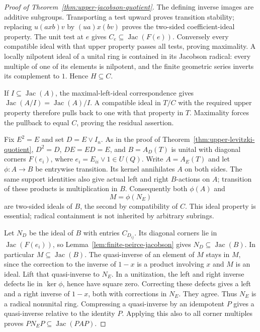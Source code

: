 \begin{proof}[Proof of Theorem~\ref{thm:upper-jacobson-quotient}]
The defining inverse images are additive subgroups. Transporting a
test upward proves transition stability; replacing $u(axb)v$ by
$(ua)x(bv)$ proves the two-sided coefficient-ideal property.
The unit test at $e$ gives $C_e\subseteq\operatorname{Jac}(F(e))$.
Conversely every compatible ideal with that upper property passes
all tests, proving maximality. A locally nilpotent ideal of a
unital ring is contained in its Jacobson radical: every multiple
of one of its elements is nilpotent, and the finite geometric
series inverts its complement to $1$. Hence $H\subseteq C$.

If $I\subseteq\operatorname{Jac}(A)$, the maximal-left-ideal
correspondence gives
$\operatorname{Jac}(A/I)=\operatorname{Jac}(A)/I$.
A compatible ideal in $T/C$ with the required upper property
therefore pulls back to one with that property in $T$.
Maximality forces the pullback to equal $C$, proving the residual
assertion.

Fix $E^2=E$ and set $D=E\vee I_n$. As in the proof of
Theorem~\ref{thm:upper-levitzki-quotient}, $D^2=D$, $DE=ED=E$,
and $B=A_D(T)$ is unital with diagonal corners
$F(e_i)$, where $e_i=E_{ii}\vee1\in U(Q)$. Write
$A=A_E(T)$ and let $\phi:A\to B$ be entrywise transition.
Its kernel annihilates $A$ on both sides. The same support
identities also give actual left and right $B$-actions on $A$;
transition of these products is multiplication in $B$.
Consequently both $\phi(A)$ and
\[
 M=\phi(N_E)
\]
are two-sided ideals of $B$, the second by compatibility of $C$.
This ideal property is essential; radical containment is not
inherited by arbitrary subrings.

Let $N_D$ be the ideal of $B$ with entries $C_{D_{ij}}$.
Its diagonal corners lie in $\operatorname{Jac}(F(e_i))$, so
Lemma~\ref{lem:finite-peirce-jacobson} gives
$N_D\subseteq\operatorname{Jac}(B)$. In particular
$M\subseteq\operatorname{Jac}(B)$. The quasi-inverse of an
element of $M$ stays in $M$, since the correction to the inverse
of $1-x$ is a product involving $x$ and $M$ is an ideal.
Lift that quasi-inverse to $N_E$. In a unitization, the left and
right inverse defects lie in $\ker\phi$, hence have square zero.
Correcting these defects gives a left and a right inverse of
$1-x$, both with corrections in $N_E$. They agree. Thus $N_E$
is a radical nonunital ring. Compressing a quasi-inverse by an
idempotent $P$ gives a quasi-inverse relative to the identity $P$.
Applying this also to all corner multiples proves
$PN_EP\subseteq\operatorname{Jac}(PAP)$.


\end{proof}
